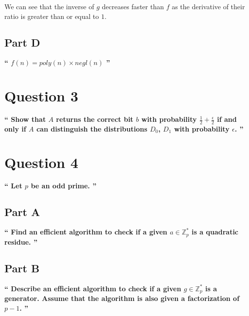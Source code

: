 \documentclass{article}
\newcommand{\HomeworkText}[1]{\textbf{``#1''}\\}
\begin{document}
We can see that the inverse of $g$ decreases faster than $f$ as the derivative of their ratio is greater than or equal to $1$.


	\subsection*{Part D}
	\HomeworkText{
		$f(n) = poly(n) \times negl(n)$
	}


	\clearpage
	\section*{Question 3}
	\HomeworkText{
		Show that $A$ returns the correct bit $b$ with probability $\frac{1}{2} + \frac{\epsilon}{2}$ if and only if $A$ can distinguish the distributions $D_0$, $D_1$ with probability $\epsilon$.
	}
	

	\clearpage
	\section*{Question 4}
	\HomeworkText{
		Let $p$ be an odd prime.
	}
	\subsection*{Part A}
	\HomeworkText{
		Find an efficient algorithm to check if a given $a \in \mathbb{Z}^{*}_{p}$ is a quadratic residue.
	}


	\subsection*{Part B}
	\HomeworkText{
		Describe an efficient algorithm to check if a given $g \in \mathbb{Z}^{*}_{p}$ is a generator. Assume that the algorithm is also given a factorization of $p - 1$.
	}
\end{document}
